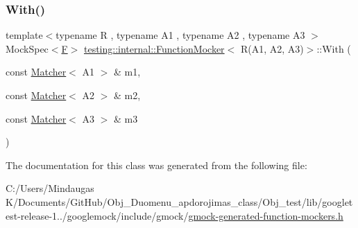 \mbox{\label{classtesting_1_1internal_1_1_function_mocker_3_01_r_07_a1_00_01_a2_00_01_a3_08_4_a06fc66e2e75ff98d257966e7234bb833}} 
\subsubsection{\texorpdfstring{With()}{With()}}
{\footnotesize\ttfamily template$<$typename R , typename A1 , typename A2 , typename A3 $>$ \\
Mock\+Spec$<$\mbox{\hyperlink{classtesting_1_1internal_1_1_function_mocker_3_01_r_07_a1_00_01_a2_00_01_a3_08_4_a8c471830f963b8012785eb3eeca2cc9c}{F}}$>$ \mbox{\hyperlink{classtesting_1_1internal_1_1_function_mocker}{testing\+::internal\+::\+Function\+Mocker}}$<$ R(A1, A2, A3)$>$\+::With (\begin{DoxyParamCaption}\item[{const \mbox{\hyperlink{classtesting_1_1_matcher}{Matcher}}$<$ A1 $>$ \&}]{m1,  }\item[{const \mbox{\hyperlink{classtesting_1_1_matcher}{Matcher}}$<$ A2 $>$ \&}]{m2,  }\item[{const \mbox{\hyperlink{classtesting_1_1_matcher}{Matcher}}$<$ A3 $>$ \&}]{m3 }\end{DoxyParamCaption})\hspace{0.3cm}{\ttfamily [inline]}}



The documentation for this class was generated from the following file\+:\begin{DoxyCompactItemize}
\item 
C\+:/\+Users/\+Mindaugas K/\+Documents/\+Git\+Hub/\+Obj\+\_\+\+Duomenu\+\_\+apdorojimas\+\_\+class/\+Obj\+\_\+test/lib/googletest-\/release-\/1../googlemock/include/gmock/\mbox{\hyperlink{_obj__test_2lib_2googletest-release-1_88_81_2googlemock_2include_2gmock_2gmock-generated-function-mockers_8h}{gmock-\/generated-\/function-\/mockers.\+h}}\end{DoxyCompactItemize}
